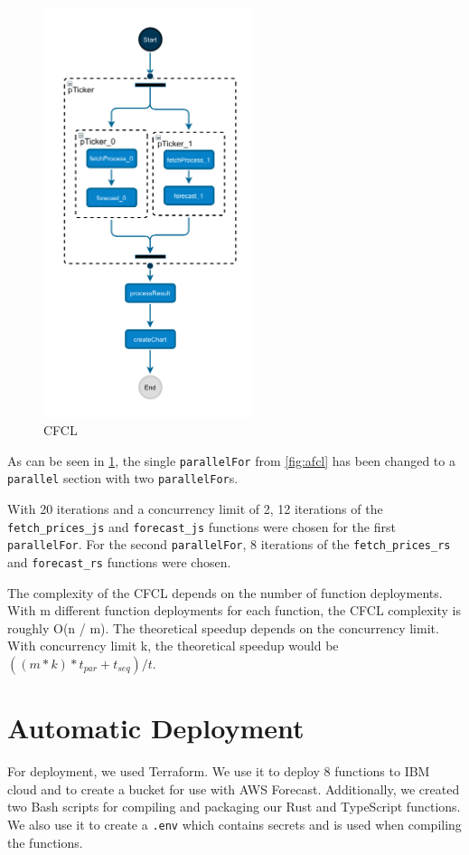 \begin{figure}[h]
  \centering
  \includegraphics[height=12cm, keepaspectratio]{./assets/cfcl}
  \caption{CFCL}
  \label{fig:cfcl}
\end{figure}

As can be seen in \cref{fig:cfcl}, the single \texttt{parallelFor} from \cref{fig:afcl} has
been changed to a \texttt{parallel} section with two \texttt{parallelFor}s.

With 20 iterations and a concurrency limit of 2, 12 iterations of the \texttt{fetch\_prices\_js} and \texttt{forecast\_js}
functions were chosen for the first \texttt{parallelFor}. For the second \texttt{parallelFor},
8 iterations of the \texttt{fetch\_prices\_rs} and \texttt{forecast\_rs} functions were chosen.

The complexity of the CFCL depends on the number of function deployments. With m different function deployments for each function, the CFCL
complexity is roughly O(n / m). The theoretical speedup depends on the concurrency limit. With concurrency limit k, the theoretical speedup
would be $((m * k) * t_{par} + t_{seq}) / t$.



%
%
%
\section{Automatic Deployment}

For deployment, we used Terraform. We use it to deploy 8 functions to IBM cloud and
to create a bucket for use with AWS Forecast. Additionally, we created two Bash scripts
for compiling and packaging our Rust and TypeScript functions. We also use it to create
a \texttt{.env} which contains secrets and is used when compiling the functions.

